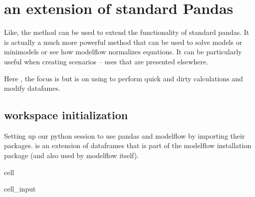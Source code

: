 \documentclass[letterpaper,10pt,english]{jupyterBook}
\begin{document}
\chapter{ an extension of standard Pandas}
\label{\detokenize{content/04_PythonEssentials/mfcalc:mfcalc-an-extension-of-standard-pandas}}\label{\detokenize{content/04_PythonEssentials/mfcalc::doc}}
\sphinxAtStartPar
Like, the  method can be used to extend the functionality of standard pandas.  It is actually a much more powerful method that can be used to solve models or mini\sphinxhyphen{}models or see how modelflow normalizes equations.  It can be particularly useful when creating scenarios – uses that are presented elsewhere.

\sphinxAtStartPar
Here , the focus is but is on using to perform quick and dirty calculations and modify datafames.


\section{workspace initialization}
\label{\detokenize{content/04_PythonEssentials/mfcalc:workspace-initialization}}
\sphinxAtStartPar
Setting up our python session to use pandas and modelflow by importing their packages.   is an extension of dataframes that is part of the modelflow installation package (and also used by modelflow itself).

\begin{sphinxuseclass}{cell}\begin{sphinxVerbatimInput}

\begin{sphinxuseclass}{cell_input}
\begin{sphinxVerbatim}[commandchars=\\\{\}]
     
        
\end{sphinxVerbatim}

\end{sphinxuseclass}\end{sphinxVerbatimInput}

\end{sphinxuseclass}
\end{document}
